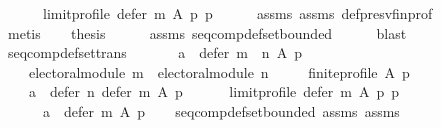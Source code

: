 \begin{isabellebody}
\ \ \ \ \ \ {\isacharparenleft}{\kern0pt}limit{\isacharunderscore}{\kern0pt}profile\ {\isacharparenleft}{\kern0pt}defer\ m\ A\ p{\isacharparenright}{\kern0pt}\ p{\isacharparenright}{\kern0pt}{\isacharparenright}{\kern0pt}{\isachardoublequoteclose}\isanewline
\ \ \ \ \isamarkupfalse%
\ assms{\isacharparenleft}{\kern0pt}{}{\isacharparenright}{\kern0pt}\ assms{\isacharparenleft}{\kern0pt}{}{\isacharparenright}{\kern0pt}\ def{\isacharunderscore}{\kern0pt}presv{\isacharunderscore}{\kern0pt}fin{\isacharunderscore}{\kern0pt}prof\isanewline
\ \ \ \ \isamarkupfalse%
\ metis\isanewline
\ \ \isamarkupfalse%
\ {\isacharquery}{\kern0pt}thesis\isanewline
\ \ \ \ \isamarkupfalse%
\ assms\ seq{\isacharunderscore}{\kern0pt}comp{\isacharunderscore}{\kern0pt}def{\isacharunderscore}{\kern0pt}set{\isacharunderscore}{\kern0pt}bounded\isanewline
\ \ \ \ \isamarkupfalse%
\ blast\isanewline
{}\isamarkupfalse%
%
\endisatagproof
{\isafoldproof}%
%
\isadelimproof
\isanewline
%
\endisadelimproof
\isanewline
{}\isamarkupfalse%
\ seq{\isacharunderscore}{\kern0pt}comp{\isacharunderscore}{\kern0pt}def{\isacharunderscore}{\kern0pt}set{\isacharunderscore}{\kern0pt}trans{\isacharcolon}{\kern0pt}\isanewline
\ \ \isanewline
\ \ \ \ {\isachardoublequoteopen}a\ {\isasymin}\ {\isacharparenleft}{\kern0pt}defer\ {\isacharparenleft}{\kern0pt}m\ {\isasymtriangleright}\ n{\isacharparenright}{\kern0pt}\ A\ p{\isacharparenright}{\kern0pt}{\isachardoublequoteclose}\ \isanewline
\ \ \ \ {\isachardoublequoteopen}electoral{\isacharunderscore}{\kern0pt}module\ m\ {\isasymand}\ electoral{\isacharunderscore}{\kern0pt}module\ n{\isachardoublequoteclose}\ \isanewline
\ \ \ \ {\isachardoublequoteopen}finite{\isacharunderscore}{\kern0pt}profile\ A\ p{\isachardoublequoteclose}\isanewline
\ \ \isanewline
\ \ \ \ {\isachardoublequoteopen}a\ {\isasymin}\ defer\ n\ {\isacharparenleft}{\kern0pt}defer\ m\ A\ p{\isacharparenright}{\kern0pt}\isanewline
\ \ \ \ \ \ {\isacharparenleft}{\kern0pt}limit{\isacharunderscore}{\kern0pt}profile\ {\isacharparenleft}{\kern0pt}defer\ m\ A\ p{\isacharparenright}{\kern0pt}\ p{\isacharparenright}{\kern0pt}\ {\isasymand}\isanewline
\ \ \ \ \ \ a\ {\isasymin}\ defer\ m\ A\ p{\isachardoublequoteclose}\isanewline
%
\isadelimproof
\ \ %
\endisadelimproof
%
\isatagproof
{}\isamarkupfalse%
\ seq{\isacharunderscore}{\kern0pt}comp{\isacharunderscore}{\kern0pt}def{\isacharunderscore}{\kern0pt}set{\isacharunderscore}{\kern0pt}bounded\ assms{\isacharparenleft}{\kern0pt}{}{\isacharparenright}{\kern0pt}\ assms{\isacharparenleft}{\kern0pt}{}{\isacharparenright}{\kern0pt}\isanewline

\end{isabellebody}
